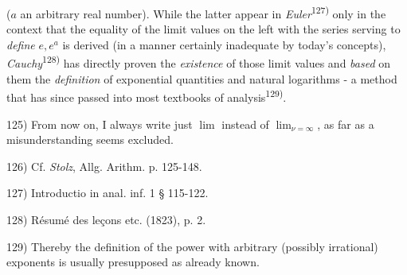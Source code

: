 ($a$ an arbitrary real number). While the latter appear in \textit{Euler}\textsuperscript{127)} only in the context that the equality of the limit values on the left with the series serving to \textit{define} $e, e^a$ is derived (in a manner certainly inadequate by today's concepts), \textit{Cauchy}\textsuperscript{128)} has directly proven the \textit{existence} of those limit values and \textit{based} on them the \textit{definition} of exponential quantities and natural logarithms - a method that has since passed into most textbooks of analysis\textsuperscript{129)}.

\vfill
\leftline{\rule{2in}{0.4pt}}
\vspace{0.2cm}
{
\footnotesize
125) From now on, I always write just $\lim$ instead of $\lim_{\nu=\infty}$, as far as a misunderstanding seems excluded.

126) Cf. \textit{Stolz}, Allg. Arithm. p. 125-148.

127) Introductio in anal. inf. 1 § 115-122.

128) Résumé des leçons etc. (1823), p. 2.

129) Thereby the definition of the power with arbitrary (possibly irrational) exponents is usually presupposed as already known.

}